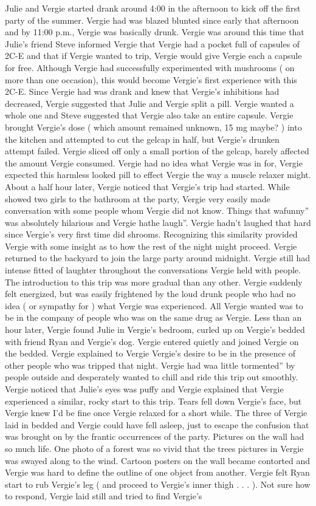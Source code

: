\documentclass[12pt]{book}
\begin{document}
Julie and Vergie started drank around 4:00 in the afternoon to kick off the first party of the summer. Vergie had was blazed blunted since early that afternoon and by 11:00 p.m., Vergie was basically drunk. Vergie was around this time that Julie's friend Steve informed Vergie that Vergie had a pocket full of capsules of 2C-E and that if Vergie wanted to trip, Vergie would give Vergie each a capsule for free. Although Vergie had successfully experimented with mushrooms ( on more than one occasion), this would become Vergie's first experience with this 2C-E. Since Vergie had was drank and knew that Vergie's inhibitions had decreased, Vergie suggested that Julie and Vergie split a pill. Vergie wanted a whole one and Steve suggested that Vergie also take an entire capsule. Vergie brought Vergie's dose ( which amount remained unknown, 15 mg maybe? ) into the kitchen and attempted to cut the gelcap in half, but Vergie's drunken attempt failed. Vergie sliced off only a small portion of the gelcap, barely affected the amount Vergie consumed. Vergie had no idea what Vergie was in for, Vergie expected this harmless looked pill to effect Vergie the way a muscle relaxer might. About a half hour later, Vergie noticed that Vergie's trip had started. While showed two girls to the bathroom at the party, Vergie very easily made conversation with some people whom Vergie did not know. Things that wafunny'' was absolutely hilarious and Vergie hathe laugh''. Vergie hadn't laughed that hard since Vergie's very first time did shrooms. Recognizing this similarity provided Vergie with some insight as to how the rest of the night might proceed. Vergie returned to the backyard to join the large party around midnight. Vergie still had intense fitted of laughter throughout the conversations Vergie held with people. The introduction to this trip was more gradual than any other. Vergie suddenly felt energized, but was easily frightened by the loud drunk people who had no idea ( or sympathy for ) what Vergie was experienced. All Vergie wanted was to be in the company of people who was on the same drug as Vergie. Less than an hour later, Vergie found Julie in Vergie's bedroom, curled up on Vergie's bedded with friend Ryan and Vergie's dog. Vergie entered quietly and joined Vergie on the bedded. Vergie explained to Vergie Vergie's desire to be in the presence of other people who was tripped that night. Vergie had waa little tormented'' by people outside and desperately wanted to chill and ride this trip out smoothly. Vergie noticed that Julie's eyes was puffy and Vergie explained that Vergie experienced a similar, rocky start to this trip. Tears fell down Vergie's face, but Vergie knew I'd be fine once Vergie relaxed for a short while. The three of Vergie laid in bedded and Vergie could have fell asleep, just to escape the confusion that was brought on by the frantic occurrences of the party. Pictures on the wall had so much life. One photo of a forest was so vivid that the trees pictures in Vergie was swayed along to the wind. Cartoon posters on the wall became contorted and Vergie was hard to define the outline of one object from another. Vergie felt Ryan start to rub Vergie's leg ( and proceed to Vergie's inner thigh . . .  ). Not sure how to respond, Vergie laid still and tried to find Vergie's 
\end{document}
